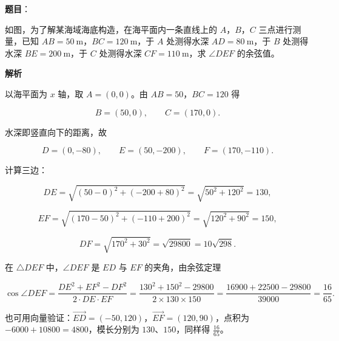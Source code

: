 \begin{answer}

\textbf{题目}：

如图，为了解某海域海底构造，在海平面内一条直线上的 $A$，$B$，$C$ 三点进行测量，已知 $AB=50\ \mathrm m$，$BC=120\ \mathrm m$，于 $A$ 处测得水深 $AD=80\ \mathrm m$，于 $B$ 处测得水深 $BE=200\ \mathrm m$，于 $C$ 处测得水深 $CF=110\ \mathrm m$，求 $\angle DEF$ 的余弦值。
\nopagebreak[4]
\begin{center}\end{center}
\nopagebreak[4]
\textbf{解析}

以海平面为 $x$ 轴，取 $A=(0,0)$。由 $AB=50$，$BC=120$ 得

\nopagebreak[4]
\[B=(50,0),\qquad C=(170,0).\]

水深即竖直向下的距离，故

\nopagebreak[4]
\[D=(0,-80),\qquad E=(50,-200),\qquad F=(170,-110).\]

计算三边：

\nopagebreak[4]
\[DE=\sqrt{(50-0)^2+(-200+80)^2}=\sqrt{50^2+120^2}=130,\]

\nopagebreak[4]
\[EF=\sqrt{(170-50)^2+(-110+200)^2}=\sqrt{120^2+90^2}=150,\]

\nopagebreak[4]
\[DF=\sqrt{170^2+30^2}=\sqrt{29800}=10\sqrt{298}.\]

在 $\triangle DEF$ 中，$\angle DEF$ 是 $ED$ 与 $EF$ 的夹角，由余弦定理

\nopagebreak[4]
\[\cos\angle DEF=\frac{DE^2+EF^2-DF^2}{2\cdot DE\cdot EF}
=\frac{130^2+150^2-29800}{2\times130\times150}
=\frac{16900+22500-29800}{39000}=\frac{16}{65}.\]

也可用向量验证：$\overrightarrow{ED}=(-50,120)$，$\overrightarrow{EF}=(120,90)$，点积为 $-6000+10800=4800$，模长分别为 $130$、$150$，同样得 $\frac{16}{65}$。


\end{answer}
